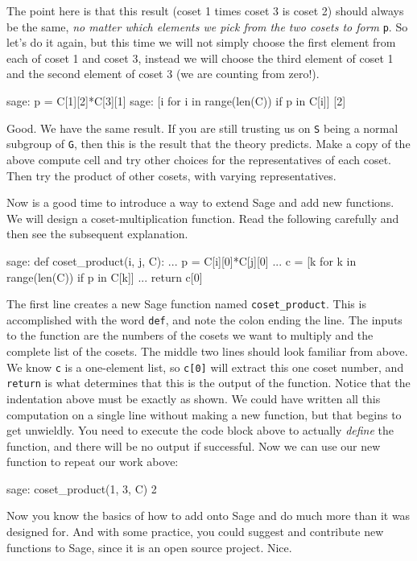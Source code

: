 %
The point here is that this result (coset 1 times coset 3 is coset 2) should always be the same, \emph{no matter which elements we pick from the two cosets to form} \verb?p?.  So let's do it again, but this time we will not simply choose the first element from each of coset 1 and coset 3, instead we will choose the third element of coset 1 and the second element of coset 3 (we are counting from zero!).
%
\begin{sageexample}
sage: p = C[1][2]*C[3][1]
sage: [i for i in range(len(C)) if p in C[i]]
[2]
\end{sageexample}
%
Good.  We have the same result.  If you are still trusting us on \verb?S? being a normal subgroup of \verb?G?, then this is the result that the theory predicts.  Make a copy of the above compute cell and try other choices for the representatives of each coset.  Then try the product of other cosets, with varying representatives.
%
\begin{sageverbatim}

\end{sageverbatim}
%
Now is a good time to introduce a way to extend Sage and add new functions.  We will design a coset-multiplication function.  Read the following carefully and then see the subsequent explanation.
%
\begin{sageexample}
sage: def coset_product(i, j, C):
...     p = C[i][0]*C[j][0]
...     c = [k for k in range(len(C)) if p in C[k]]
...     return c[0]
\end{sageexample}
%
The first line creates a new Sage function named \verb?coset_product?.  This is accomplished with the word \verb?def?, and note the colon ending the line.  The inputs to the function are the numbers of the cosets we want to multiply and the complete list of the cosets.  The middle two lines should look familiar from above.  We know \verb?c? is a one-element list, so \verb?c[0]? will extract this one coset number, and \verb?return? is what determines that this is the output of the function.  Notice that the indentation above must be exactly as shown.  We could have written all this computation on a single line without making a new function, but that begins to get unwieldly.  You need to execute the code block above to actually \emph{define} the function, and there will be no output if successful.  Now we can use our new function to repeat our work above:
%
\begin{sageexample}
sage: coset_product(1, 3, C)
2
\end{sageexample}
%
Now you know the basics of how to add onto Sage and do much more than it was designed for.  And with some practice, you could suggest and contribute new functions to Sage, since it is an open source project.  Nice.\par
